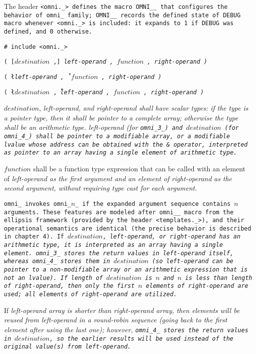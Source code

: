 The header \tt{<omni._>} defines the macro \tt{OMNI__} that configures
the behavior of \tt{omni_} family; \tt{OMNI__} records the \tt{defined}
state of \tt{DEBUG} macro whenever \tt{<omni._>} is included:
it expands to \tt{1} if \tt{DEBUG} was defined, and \tt{0} otherwise.


\tt{# include <omni._>}

\s\s\s\tt{(} [$destination$ \tt{,}]
\it{left-operand} \tt{,} $function$ \tt{,} \it{right-operand} \tt{)}

\s\tt{(} \l\it{left-operand} \tt{,}\r\
$function$ \tt{,} \it{right-operand} \tt{)}

\s\tt{(} \l$destination$ \tt{,}\r\
\it{left-operand} \tt{,} $function$ \tt{,} \it{right-operand} \tt{)}

\head{Constraints}

$destination$, \it{left-operand}, and \it{right-operand} shall have
scalar types: if the type is a pointer type, then it shall be pointer
to a complete array; otherwise the type shall be an arithmetic type.
\it{left-operand} (for \tt{omni_3_}) and $destination$ (for \tt{omni_4_})
shall be pointer to a modifiable array, or a modifiable lvalue whose
address can be obtained with the \tt{&} operator, interpreted as
pointer to an array having a single element of arithmetic type.

$function$ shall be a function type expression that can be called with an element
of \it{left-operand} as the first argument and an element of \it{right-operand}
as the second argument, without requiring type cast for each argument.

\head{Semantics}

\tt{omni_} invokes \tt{omni_}$n$\_ if the
expanded argument sequence contains $n$ arguments.
These features are modeled after  \tt{omni__} macro from the ellipsis
framework (provided by the header \tt{<templates._>}), and their operational
semantics are identical (the precise behavior is described in chapter 4).
If $destination$, \it{left-operand}, or \it{right-operand} has an
arithmetic type, it is interpreted as an array having a single element.
\tt{omni_3_} stores the return values in \it{left-operand} itself, whereas
\tt{omni_4_} stores them in $destination$ (so \it{left-operand} can be pointer
to a non-modifiable array or an arithmetic expression that is not an lvalue).
If length of $destination$ is $n$ and $n$ is less than length of
\it{right-operand}, then only the first $n$ elements of \it{right-operand}
are used; all elements of \it{right-operand} are utilized.

\note If \it{left-operand} array is shorter than \it{right-operand} array,
then elements will be reused from \it{left-operand} in a round-robin sequence
(going back to the first element after using the last one);
however, \tt{omni_4_} stores the return values in $destination$, so the earlier
results will be used instead of the original value(s) from \it{left-operand}.
